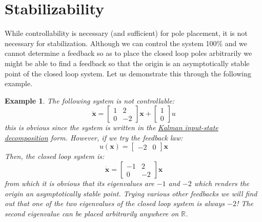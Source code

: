\documentclass[a4paper,10pt,oneside]{book}
\newtheorem{example}{Example}
\begin{document}
\section{Stabilizability}
While controllability is necessary (and sufficient) for pole placement, it is not necessary for stabilization. Although we can control the system 100\% and we cannot determine a feedback so as to place the closed loop poles arbitrarily we might be able to find a feedback so that the origin is an asymptotically stable point of the closed loop system. Let us demonstrate this through the following example.
\begin{example}
 The following system is not controllable:
 \begin{equation}
  \dot{\mathbf{x}}=\left[ {\begin{array}{cc}1&2\\0&-2 \end{array} } \right]\mathbf{x}+\left[ {\begin{array}{c}1\\0 \end{array} } \right]u
 \end{equation}
this is obvious since the system is written in the \hyperlink{prop:InputDecoupling}{Kalman input-state decomposition} form. However, if we try the feedback law:
\begin{equation}
 u(\mathbf{x})=\left[ {\begin{array}{cc}-2&0 \end{array} } \right]\mathbf{x}
\end{equation}
Then, the closed loop system is:
 \begin{equation}
  \dot{\mathbf{x}}=\left[ {\begin{array}{cc}-1&2\\0&-2 \end{array} } \right]\mathbf{x}
 \end{equation}
from which it is obvious that its eigenvalues are $-1$ and $-2$ which renders the origin an asymptotically stable point. Trying various other feedbacks we will find out that one of the two eigenvalues of the closed loop system is always $-2$! The second eigenvalue can be placed arbitrarily anywhere on $\mathbb{R}$.
\end{example}
\end{document}
